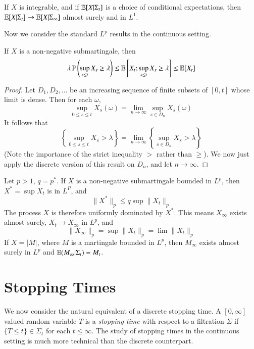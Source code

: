 \begin{theorem}
    If $X$ is integrable, and if $\operatorname{\mathbb{E}}[X|\Sigma_t]$ is a \cadlag choice of conditional expectations, then $\operatorname{\mathbb{E}}[X|\Sigma_t] \to \operatorname{\mathbb{E}}[X|\Sigma_\infty]$ almost surely and in $L^1$.
\end{theorem}

Now we consider the standard $L^p$ results in the continuous setting.

\begin{theorem}
    If $X$ is a non-negative \cadlag submartingale, then
    \[ \lambda \operatorname{\mathbb{P}} \left( \sup_{s \leq t} X_s \geq \lambda \right) \leq \operatorname{\mathbb{E}} \left[X_t; \sup_{s \leq t} X_s \geq \lambda \right] \leq \operatorname{\mathbb{E}}[X_t] \]
\end{theorem}
\begin{proof}
    Let $D_1, D_2, \dots$ be an increasing sequence of finite subsets of $[0,t]$ whose limit is dense. Then for each $\omega$,
    \[ \sup_{0 \leq s \leq t} X_s(\omega) = \lim_{n \to \infty} \sup_{s \in D_n} X_s(\omega) \]
    It follows that
    \[ \left\{ \sup_{0 \leq s \leq t} X_s > \lambda \right\} = \lim_{n \to \infty} \left\{ \sup_{s \in D_n} X_s > \lambda \right\} \]
    (Note the importance of the strict inequality $>$ rather than $\geq$). We now just apply the discrete version of this result on $D_n$, and let $n \to \infty$.
\end{proof}

\begin{theorem}
    Let $p > 1$, $q = p^*$. If $X$ is a non-negative \cadlag submartingale bounded in $L^p$, then $X^* = \sup X_t$ is in $L^P$, and
    \[ \| X^* \|_p \leq q \sup \| X_t \|_p \]
    The process $X$ is therefore uniformly dominated by $X^*$. This means $X_\infty$ exists almost surely, $X_t \to X_\infty$ in $L^p$, and
    \[ \|X_\infty \|_p = \sup \|X_t \|_p = \lim \| X_t \|_p \]
    If $X = |M|$, where $M$ is a \cadlag martingale bounded in $L^p$, then $M_\infty$ exists almost surely in $L^p$ and $\operatorname{\mathbb{E}}(M_\infty|\Sigma_t) = M_t$.
\end{theorem}

\chapter{Stopping Times}

We now consider the natural equivalent of a discrete stopping time. A $[0,\infty]$ valued random variable $T$ is a \emph{stopping time} with respect to a filtration $\Sigma$ if $\{ T \leq t \} \in \Sigma_t$ for each $t \leq \infty$. The study of stopping times in the continuous setting is much more technical than the discrete counterpart.

